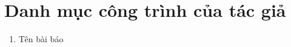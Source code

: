 \chapter*{Danh mục công trình của tác giả}
\label{publish}

\begin{enumerate}
\item Tên bài báo

\end{enumerate}